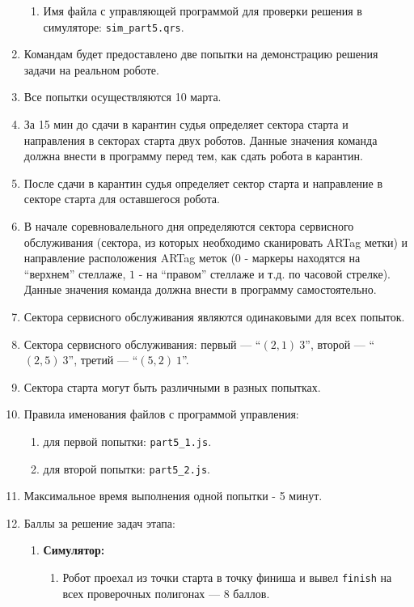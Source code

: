 \begin{enumerate}
\begin{enumerate}
        \item Имя файла с управляющей программой для проверки решения в симуляторе: \texttt{sim\_part5.qrs}.
    \end{enumerate}
    \item Командам будет предоставлено две попытки на демонстрацию решения задачи на реальном
    роботе.
    \item Все попытки осуществляются 10 марта.
    \item За 15 мин до сдачи в карантин судья определяет сектора старта
        и направления в секторах старта двух роботов. Данные значения команда должна внести в программу перед тем,
        как сдать робота в карантин.
    \item После сдачи в карантин судья определяет сектор старта
        и направление в секторе старта для оставшегося  робота.
    \item В начале соревновалельного дня определяются сектора сервисного обслуживания (сектора, из которых необходимо сканировать ARTag метки) и
    направление расположения ARTag меток ($0$ - маркеры находятся на ``верхнем'' стеллаже, $1$ - на ``правом'' стеллаже
    и т.д. по часовой стрелке). Данные значения команда должна внести в программу самостоятельно.
    \item Сектора сервисного обслуживания являются одинаковыми для всех попыток.
    \item Сектора сервисного обслуживания: первый --- ``$(2,1)~3$'', второй --- ``$(2,5)~3$'', третий --- ``$(5,2)~1$''.
    \item Сектора старта могут быть различными в разных попытках.
    \item Правила именования файлов с программой управления:
    \begin{enumerate}
        \item для первой попытки: \texttt{part5\_1.js}.
        \item для второй попытки: \texttt{part5\_2.js}.
    \end{enumerate}
    \item Максимальное время выполнения одной попытки - 5 минут.
    \item Баллы за решение задач этапа:
        \begin{enumerate}
            \item \textbf{Симулятор:}
            \begin{enumerate}
                \item Робот проехал из точки старта в точку финиша и вывел \texttt{finish} на всех проверочных полигонах --- 8 баллов.

\end{enumerate}
\end{enumerate}
\end{enumerate}

